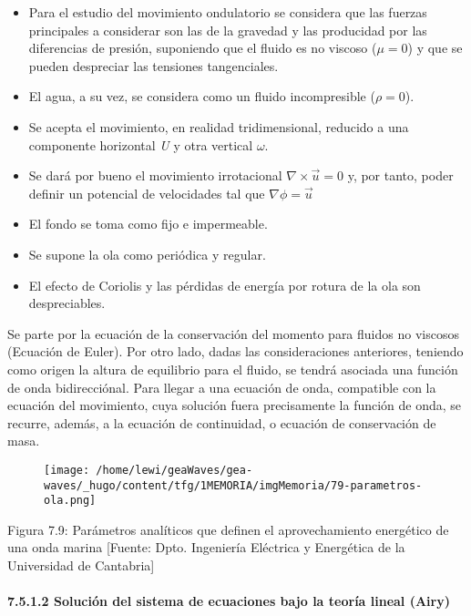 \begin{itemize}
\item
  Para el estudio del movimiento ondulatorio se considera que las
  fuerzas principales a considerar son las de la gravedad y las
  producidad por las diferencias de presión, suponiendo que el fluido es
  no viscoso (\(\mu=0\)) y que se pueden despreciar las tensiones
  tangenciales.
\item
  El agua, a su vez, se considera como un fluido incompresible
  (\(\rho =0\)).
\item
  Se acepta el movimiento, en realidad tridimensional, reducido a una
  componente horizontal \emph{U} y otra vertical \(\omega\).
\item
  Se dará por bueno el movimiento irrotacional
  \(\nabla \times \vec u=0\) y, por tanto, poder definir un potencial de
  velocidades tal que \(\nabla \phi=\vec u\)
\item
  El fondo se toma como fijo e impermeable.
\item
  Se supone la ola como periódica y regular. 
\item
  El efecto de Coriolis y las pérdidas de energía por rotura de la ola
  son despreciables.
\end{itemize}

Se parte por la ecuación de la conservación del momento para fluidos no
viscosos (Ecuación de Euler). Por otro lado, dadas las consideraciones
anteriores, teniendo como origen la altura de equilibrio para el fluido,
se tendrá asociada una función de onda bidirecciónal. Para llegar a una
ecuación de onda, compatible con la ecuación del movimiento, cuya
solución fuera precisamente la función de onda, se recurre, además, a la
ecuación de continuidad, o ecuación de conservación de masa.\\

\begin{figure}
\centering
\texttt{[image: /home/lewi/geaWaves/gea-waves/\_hugo/content/tfg/1MEMORIA/imgMemoria/79-parametros-ola.png]}
\caption{}
\end{figure}

Figura 7.9: Parámetros analíticos que definen el aprovechamiento
energético de una onda marina {[}Fuente: Dpto. Ingeniería Eléctrica y
Energética de la Universidad de Cantabria{]}

\paragraph{7.5.1.2 Solución del sistema de ecuaciones bajo la teoría
lineal (Airy)}\label{header-n211}

